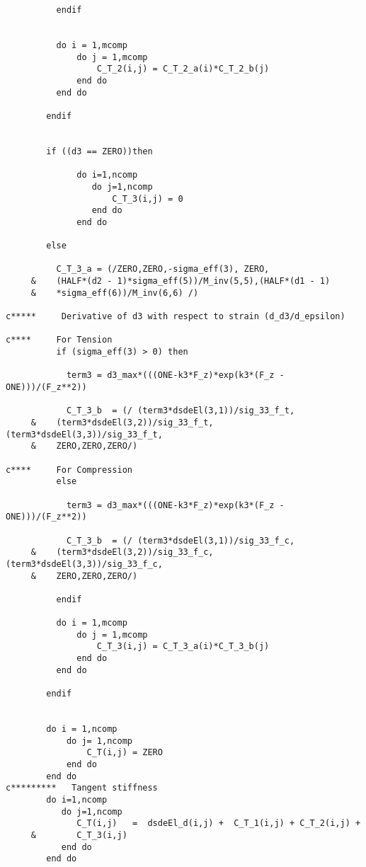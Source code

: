 \begin{lstlisting}
          endif

              
          do i = 1,mcomp
              do j = 1,mcomp
                  C_T_2(i,j) = C_T_2_a(i)*C_T_2_b(j)
              end do
          end do              
              
        endif      
      
      
        if ((d3 == ZERO))then
      
              do i=1,ncomp
                 do j=1,ncomp
                     C_T_3(i,j) = 0        
                 end do
              end do 
          
        else 
            
          C_T_3_a = (/ZERO,ZERO,-sigma_eff(3), ZERO,
     &    (HALF*(d2 - 1)*sigma_eff(5))/M_inv(5,5),(HALF*(d1 - 1)
     &    *sigma_eff(6))/M_inv(6,6) /) 
          
c*****     Derivative of d3 with respect to strain (d_d3/d_epsilon)
          
c****     For Tension 
          if (sigma_eff(3) > 0) then
              
            term3 = d3_max*(((ONE-k3*F_z)*exp(k3*(F_z - ONE)))/(F_z**2))  
              
            C_T_3_b  = (/ (term3*dsdeEl(3,1))/sig_33_f_t,
     &    (term3*dsdeEl(3,2))/sig_33_f_t,(term3*dsdeEl(3,3))/sig_33_f_t,
     &    ZERO,ZERO,ZERO/)   
              
c****     For Compression              
          else 
              
            term3 = d3_max*(((ONE-k3*F_z)*exp(k3*(F_z - ONE)))/(F_z**2))  
              
            C_T_3_b  = (/ (term3*dsdeEl(3,1))/sig_33_f_c,
     &    (term3*dsdeEl(3,2))/sig_33_f_c,(term3*dsdeEl(3,3))/sig_33_f_c,
     &    ZERO,ZERO,ZERO/)  
            
          endif
          
          do i = 1,mcomp
              do j = 1,mcomp
                  C_T_3(i,j) = C_T_3_a(i)*C_T_3_b(j)
              end do
          end do 
          
        endif


        do i = 1,ncomp
            do j= 1,ncomp
                C_T(i,j) = ZERO
            end do
        end do
c*********   Tangent stiffness  
        do i=1,ncomp
           do j=1,ncomp
              C_T(i,j)   =  dsdeEl_d(i,j) +  C_T_1(i,j) + C_T_2(i,j) +
     &        C_T_3(i,j) 
           end do
        end do
      

\end{lstlisting}

